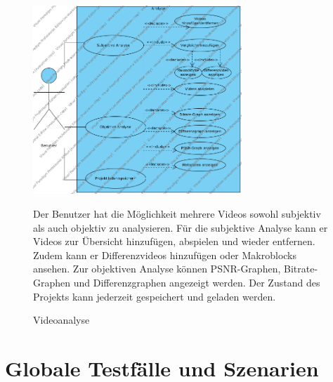 \documentclass[parskip=full]{scrartcl}
\begin{document}
\begin{figure}[htbp]
\centering
\includegraphics[width=0.7\textwidth]{UsecaseDiagrams/Analyse.png}
\caption{Videoanalyse}
\begin{flushleft}
Der Benutzer hat die Möglichkeit mehrere Videos sowohl subjektiv als auch objektiv zu analysieren. Für die subjektive Analyse kann er Videos zur Übersicht hinzufügen, abspielen und wieder entfernen. Zudem kann er Differenzvideos hinzufügen oder Makroblocks ansehen.
Zur objektiven Analyse können PSNR-Graphen, Bitrate-Graphen und Differenzgraphen angezeigt werden.
Der Zustand des Projekts kann jederzeit gespeichert und geladen werden.
\end{flushleft}
\end{figure}
\newpage
\section{Globale Testfälle und Szenarien}
\end{document}
